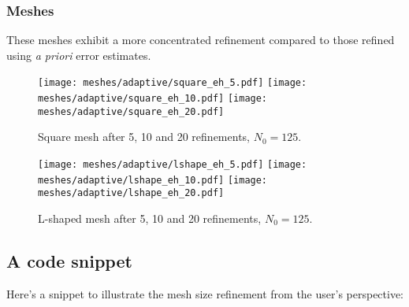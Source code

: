 \newpage
\subsubsection{Meshes}

These meshes exhibit a more concentrated refinement compared to those refined using \textit{a priori} error estimates.

\begin{figure}[!ht]
	\centering
	\texttt{[image: meshes/adaptive/square\_eh\_5.pdf]}
	\texttt{[image: meshes/adaptive/square\_eh\_10.pdf]}
	\texttt{[image: meshes/adaptive/square\_eh\_20.pdf]}
	\caption{Square mesh after 5, 10 and 20 refinements, $N_0 = 125$.}
\end{figure}

\begin{figure}[!ht]
	\centering
	\texttt{[image: meshes/adaptive/lshape\_eh\_5.pdf]}
	\texttt{[image: meshes/adaptive/lshape\_eh\_10.pdf]}
	\texttt{[image: meshes/adaptive/lshape\_eh\_20.pdf]}
	\caption{L-shaped mesh after 5, 10 and 20 refinements, $N_0 = 125$.}
\end{figure}

\newpage
\subsection{A code snippet}

Here's a snippet to illustrate the mesh size refinement from the user's perspective:

